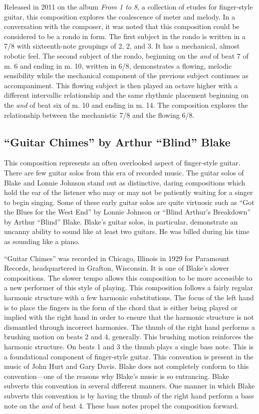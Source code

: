 \documentclass{tufte-handout}
\begin{document}
Released in 2011 on the album \emph{From 1 to 8}, a collection of etudes for
finger-style guitar, this composition explores the coalescence of meter and
melody. In a conversation with the composer, it was noted that this
composition could be considered to be a rondo in form. The first subject in
the rondo is written in a 7/8 with sixteenth-note groupings of 2, 2, and 3. It
has a mechanical, almost robotic feel. The second subject of the rondo,
beginning on the \emph{and} of beat 7 of m. 6 and ending in m. 10, written in
6/8, demonstrates a flowing, melodic sensibility while the mechanical
component of the previous subject continues as accompaniment. This flowing subject is then played an octave higher with a different intervallic relationship and the same rhythmic placement beginning on the \emph{and} of beat six of m. 10 and ending in m. 14. The composition explores the relationship between the mechanistic 7/8 and the flowing 6/8. 

\subsection*{``Guitar Chimes'' by Arthur ``Blind'' Blake}
This composition represents an often overlooked aspect of finger-style
guitar. There are few guitar solos from this era of recorded music. The guitar solos of Blake and Lonnie Johnson stand out as distinctive, daring compositions which hold the ear of the listener who may or may not be patiently waiting for a singer to begin singing. Some of these early guitar solos are quite virtuosic such as ``Got the Blues for the West End'' by Lonnie Johnson or ``Blind Arthur's Breakdown'' by Arthur ``Blind'' Blake. Blake's guitar solos, in particular, demonstrate an uncanny ability to sound like at least two guitars. He was billed during his time as sounding like a piano.

``Guitar Chimes'' was recorded in Chicago, Illinois in 1929 for Paramount
Records, headquartered in Grafton, Wisconsin. It is one of Blake's slower
compositions. The slower tempo allows this composition to be more accessible
to a new performer of this style of playing. This composition follows a fairly
regular harmonic structure with a few harmonic substitutions. The focus of the
left hand is to place the fingers in the form of the chord that is either being played or implied with the right hand in order to ensure that the harmonic structure is not dismantled through incorrect harmonies. The thumb of the right hand performs a brushing motion on beats 2 and 4, generally. This brushing motion reinforces the harmonic structure. On beats 1 and 3 the thumb plays a single bass note. This is a foundational component of finger-style guitar. This convention is present in the music of John Hurt and Gary Davis. Blake does not completely conform to this convention---one of the reasons why Blake's music is so entrancing. Blake subverts this convention in several different manners. One manner in which Blake subverts this convention is by having the thumb of the right hand perform a bass note on the \emph{and} of beat 4. These bass notes propel the composition forward.
\end{document}
